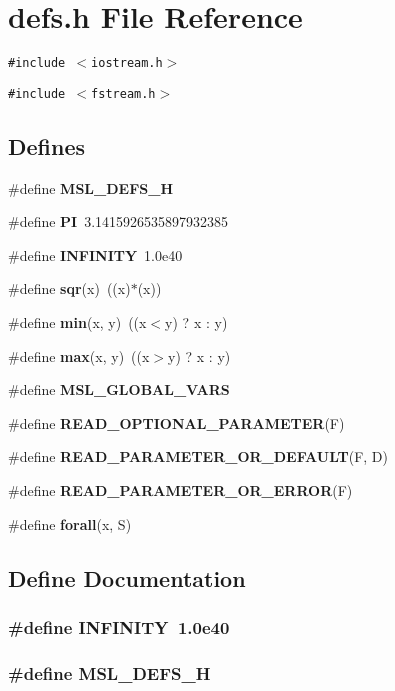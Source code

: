 \section{defs.h File Reference}
\label{defs_8h}
{\tt \#include $<$iostream.h$>$}\par
{\tt \#include $<$fstream.h$>$}\par
\subsection*{Defines}
\begin{CompactItemize}
\item 
\#define {\bf MSL\_\-DEFS\_\-H}
\item 
\#define {\bf PI}\ 3.1415926535897932385
\item 
\#define {\bf INFINITY}\ 1.0e40
\item 
\#define {\bf sqr}(x)\ ((x)$\ast$(x))
\item 
\#define {\bf min}(x, y)\ ((x$<$y) ? x : y)
\item 
\#define {\bf max}(x, y)\ ((x$>$y) ? x : y)
\item 
\#define {\bf MSL\_\-GLOBAL\_\-VARS}
\item 
\#define {\bf READ\_\-OPTIONAL\_\-PARAMETER}(F)
\item 
\#define {\bf READ\_\-PARAMETER\_\-OR\_\-DEFAULT}(F, D)
\item 
\#define {\bf READ\_\-PARAMETER\_\-OR\_\-ERROR}(F)
\item 
\#define {\bf forall}(x, S)
\end{CompactItemize}


\subsection{Define Documentation}
\subsubsection{\setlength{\rightskip}{0pt plus 5cm}\#define INFINITY\ 1.0e40}\label{defs_8h_a2}


\subsubsection{\setlength{\rightskip}{0pt plus 5cm}\#define MSL\_\-DEFS\_\-H}\label{defs_8h_a0}


